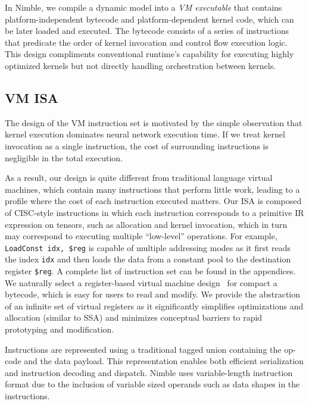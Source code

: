 In Nimble, we compile a dynamic model into a {\em VM executable} that contains platform-independent bytecode and platform-dependent kernel code, which can be later loaded and executed.
The bytecode consists of a series of instructions that predicate the order of kernel invocation and control flow execution logic.
This design compliments conventional runtime's capability for executing highly optimized kernels but not directly handling orchestration between kernels.

\subsection{VM ISA}

The design of the VM instruction set is motivated by the simple observation that kernel execution dominates neural network execution time. If we treat kernel invocation as a single instruction, the cost of surrounding instructions is negligible in the total execution.

As a result, our design is quite different from traditional language virtual machines, which contain many instructions that perform little work, leading to a profile where the cost of each instruction executed matters.
Our ISA is composed of CISC-style instructions in which each instruction corresponds to a primitive IR expression on tensors, such as allocation and kernel invocation, which in turn may correspond to executing multiple ``low-level'' operations. For example, \texttt{LoadConst idx, \$reg} is capable of multiple addressing modes as it first reads the index \texttt{idx} and then loads the data from a constant pool to the destination register \texttt{\$reg}.
A complete list of instruction set can be found in the appendices.
We naturally select a register-based virtual machine design~\citep{davis2003case} for compact a bytecode, which is easy for users to read and modify. We provide the abstraction of an infinite set of virtual registers as it significantly simplifies optimizations and allocation (similar to SSA) and minimizes conceptual barriers to rapid prototyping and modification.

Instructions are represented using a traditional tagged union containing the op-code and the data payload. This representation enables both efficient serialization and instruction decoding and dispatch. Nimble uses variable-length instruction format due to the inclusion of variable sized operands such as data shapes in the instructions.

